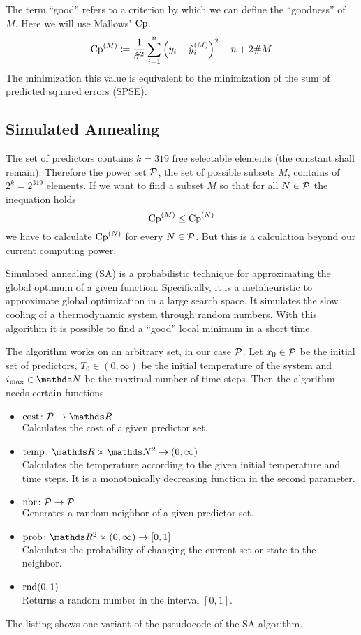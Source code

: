 		The term \enquote{good} refers to a criterion by which we can define the \enquote{goodness} of $M$.
		Here we will use Mallows' $\mathrm{Cp}$.
		\[
			\mathrm{Cp}^{(M)} \coloneqq \frac{1}{\hat{\sigma}^2}\sum_{i=1}^n\left( y_i-\hat{y}^{(M)}_i \right)^2 - n + 2\#M
		\]
		The minimization this value is equivalent to the minimization of the sum of predicted squared errors (SPSE).
	

	\subsection{Simulated Annealing}
	\label{ssec:simulated-annealing}
	
		The set of predictors contains $k=319$ free selectable elements (the constant shall remain).
		Therefore the power set $\mathcal{P}$, the set of possible subsets $M$, contains of $2^{k}=2^{319}$ elements.
		If we want to find a subset $M$ so that for all $N\in\mathcal{P}$ the inequation holds
		\[
			\mathrm{Cp}^{(M)} \leq \mathrm{Cp}^{(N)}
		\]
		we have to calculate $\mathrm{Cp}^{(N)}$ for every $N\in\mathcal{P}$.
		But this is a calculation beyond our current computing power.

		Simulated annealing (SA) is a probabilistic technique for approximating the global optimum of a given function.
		Specifically, it is a metaheuristic to approximate global optimization in a large search space.
		It simulates the slow cooling of a thermodynamic system through random numbers.
		With this algorithm it is possible to find a \enquote{good} local minimum in a short time.

		The algorithm works on an arbitrary set, in our case $\mathcal{P}$.
		Let $x_0\in\mathcal{P}$ be the initial set of predictors, $T_0\in(0,\infty)$ be the initial temperature of the system and $i_\m{max}\in\SN$ be the maximal number of time steps.
		Then the algorithm needs certain functions.
		\begin{itemize}
			\item $\func{\m{cost}}{\s{P}}{\SR}$ \\
				Calculates the cost of a given predictor set.
			\item $\func{\m{temp}}{\SR\times\SN^2}{(0,\infty)}$\\
				Calculates the temperature according to the given initial temperature and time steps.
				It is a monotonically decreasing function in the second parameter.
			\item $\mathrm{nbr}\colon\mathcal{P}\to\mathcal{P}$ \\
				Generates a random neighbor of a given predictor set.
			\item $\func{\m{prob}}{\SR^2\times(0,\infty)}{[0,1]}$ \\
				Calculates the probability of changing the current set or state to the neighbor.
			\item $\mathrm{rnd}(0,1)$ \\
				Returns a random number in the interval $[0,1]$.
		\end{itemize}
		The listing shows one variant of the pseudocode of the SA algorithm. 

